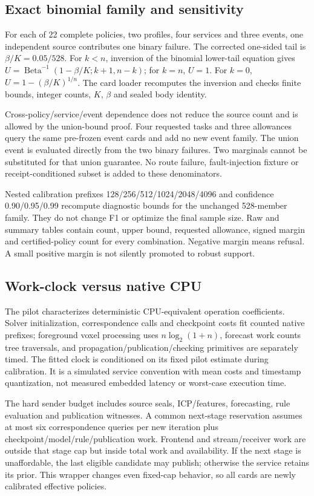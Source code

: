 \subsection{Exact binomial family and sensitivity}
For each of 22 complete policies, two profiles, four services and three events, one independent source contributes one binary failure. The corrected one-sided tail is $\beta/K=0.05/528$. For $k<n$, inversion of the binomial lower-tail equation gives $U=\operatorname{Beta}^{-1}(1-\beta/K;k+1,n-k)$; for $k=n$, $U=1$. For $k=0$, $U=1-(\beta/K)^{1/n}$. The card loader recomputes the inversion and checks finite bounds, integer counts, $K$, $\beta$ and sealed body identity.

Cross-policy/service/event dependence does not reduce the source count and is allowed by the union-bound proof. Four requested tasks and three allowances query the same pre-frozen event cards and add no new event family. The union event is evaluated directly from the two binary failures. Two marginals cannot be substituted for that union guarantee. No route failure, fault-injection fixture or receipt-conditioned subset is added to these denominators.

Nested calibration prefixes 128/256/512/1024/2048/4096 and confidence 0.90/0.95/0.99 recompute diagnostic bounds for the unchanged 528-member family. They do not change F1 or optimize the final sample size. Raw and summary tables contain count, upper bound, requested allowance, signed margin and certified-policy count for every combination. Negative margin means refusal. A small positive margin is not silently promoted to robust support.

\subsection{Work-clock versus native CPU}
The pilot characterizes deterministic CPU-equivalent operation coefficients. Solver initialization, correspondence calls and checkpoint costs fit counted native prefixes; foreground voxel processing uses $n\log_2(1+n)$, forecast work counts tree traversals, and propagation/publication/checking primitives are separately timed. The fitted clock is conditioned on its fixed pilot estimate during calibration. It is a simulated service convention with mean costs and timestamp quantization, not measured embedded latency or worst-case execution time.

The hard sender budget includes source seals, ICP/features, forecasting, rule evaluation and publication witnesses. A common next-stage reservation assumes at most six correspondence queries per new iteration plus checkpoint/model/rule/publication work. Frontend and stream/receiver work are outside that stage cap but inside total work and availability. If the next stage is unaffordable, the last eligible candidate may publish; otherwise the service retains its prior. This wrapper changes even fixed-cap behavior, so all cards are newly calibrated effective policies.


